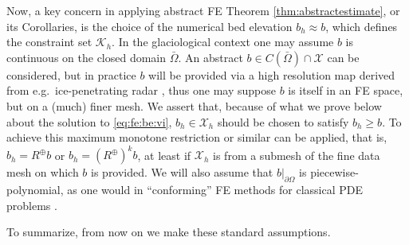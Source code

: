 \documentclass[hidelinks,onefignum,onetabnum,final]{siamart220329}  %
\newcommand{\cK}{\mathcal{K}}
\newcommand{\cX}{\mathcal{X}}
\begin{document}
Now, a key concern in applying abstract FE Theorem \ref{thm:abstractestimate}, or its Corollaries, is the choice of the numerical bed elevation $b_h \approx b$, which defines the constraint set $\cK_h$.  In the glaciological context one may assume $b$ is continuous on the closed domain $\bar\Omega$.  An abstract $b\in C(\bar\Omega) \cap \cX$ can be considered, but in practice $b$ will be provided via a high resolution map derived from e.g.~ice-penetrating radar \cite{Morlighemetal2017}, thus one may suppose $b$ is itself in an FE space, but on a (much) finer mesh.  We assert that, because of what we prove below about the solution to \eqref{eq:fe:be:vi}, $b_h \in \cX_h$ should be chosen to satisfy $b_h\ge b$.  To achieve this maximum monotone restriction \cite{BuelerFarrell2024} or similar can be applied, that is, $b_h = R^\oplus b$ or $b_h = (R^\oplus)^k b$, at least if $\cX_h$ is from a submesh of the fine data mesh on which $b$ is provided.  We will also assume that $b|_{\partial\Omega}$ is piecewise-polynomial, as one would in ``conforming'' FE methods for classical PDE problems \cite{Elmanetal2014}.

To summarize, from now on we make these standard assumptions.
\end{document}

